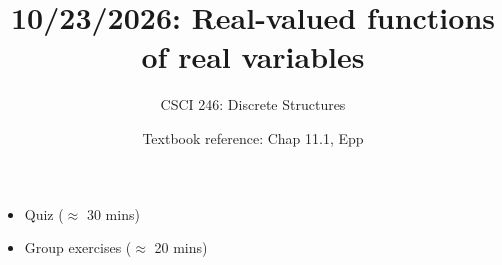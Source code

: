 \documentclass[10pt]{beamer}
\begin{document}






\title{10/23/2026: Real-valued functions of real variables}
\author{CSCI 246: Discrete Structures}
\date{Textbook reference: Chap 11.1, Epp}

\begin{frame}
    \titlepage 
\end{frame}


\begin{frame}



\vfill 


\begin{myyellowbox}[title=Today's Agenda]
\begin{itemize}
	\item Quiz ($\approx$ 30 mins)
	\item Group exercises ($\approx$ 20 mins)
\end{itemize}

%	
\end{myyellowbox}
\vfill 

\end{frame}
\end{document}
